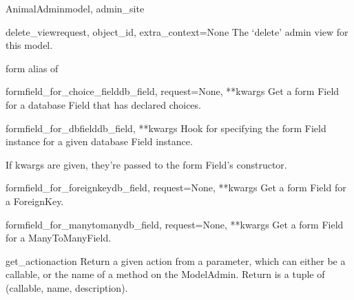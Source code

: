\documentclass[letterpaper,10pt,english]{sphinxmanual}
\begin{document}
\begin{classdesc}{AnimalAdmin}{model, admin\_site}
\hypertarget{animal.admin.AnimalAdmin.delete_view}{}\begin{methoddesc}{delete\_view}{request, object\_id, extra\_context=None}
The `delete' admin view for this model.
\end{methoddesc}

\hypertarget{animal.admin.AnimalAdmin.form}{}\begin{memberdesc}{form}
alias of 
\end{memberdesc}

\hypertarget{animal.admin.AnimalAdmin.formfield_for_choice_field}{}\begin{methoddesc}{formfield\_for\_choice\_field}{db\_field, request=None, **kwargs}
Get a form Field for a database Field that has declared choices.
\end{methoddesc}

\hypertarget{animal.admin.AnimalAdmin.formfield_for_dbfield}{}\begin{methoddesc}{formfield\_for\_dbfield}{db\_field, **kwargs}
Hook for specifying the form Field instance for a given database Field
instance.

If kwargs are given, they're passed to the form Field's constructor.
\end{methoddesc}

\hypertarget{animal.admin.AnimalAdmin.formfield_for_foreignkey}{}\begin{methoddesc}{formfield\_for\_foreignkey}{db\_field, request=None, **kwargs}
Get a form Field for a ForeignKey.
\end{methoddesc}

\hypertarget{animal.admin.AnimalAdmin.formfield_for_manytomany}{}\begin{methoddesc}{formfield\_for\_manytomany}{db\_field, request=None, **kwargs}
Get a form Field for a ManyToManyField.
\end{methoddesc}

\hypertarget{animal.admin.AnimalAdmin.get_action}{}\begin{methoddesc}{get\_action}{action}
Return a given action from a parameter, which can either be a callable,
or the name of a method on the ModelAdmin.  Return is a tuple of
(callable, name, description).
\end{methoddesc}


\end{classdesc}
\end{document}
